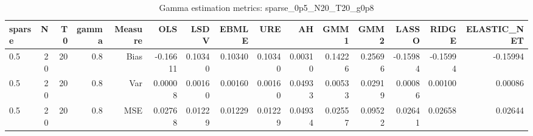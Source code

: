\begin{table}[!htbp]\centering
\caption{Gamma estimation metrics: sparse_0p5_N20_T20_g0p8}
\label{tab:table1_sparse_0p5_N20_T20_g0p8}
\begin{tabular}{lrrrrrrrrrrrrrr}
\hline
sparse & N & T0 & gamma & Measure & OLS & LSDV & EBMLE & URE & AH & GMM1 & GMM2 & LASSO & RIDGE & ELASTIC_NET \\
\hline
0.5 & 20 & 20 & 0.8 & Bias & -0.16611 & 0.10340 & 0.10340 & 0.10340 & 0.00310 & 0.14226 & 0.25696 & -0.15984 & -0.15994 & -0.15994 \\
0.5 & 20 & 20 & 0.8 & Var & 0.00008 & 0.00160 & 0.00160 & 0.00160 & 0.04933 & 0.00533 & 0.02919 & 0.00086 & 0.00100 & 0.00086 \\
0.5 & 20 & 20 & 0.8 & MSE & 0.02768 & 0.01229 & 0.01229 & 0.01229 & 0.04934 & 0.02557 & 0.09522 & 0.02641 & 0.02658 & 0.02644 \\
\hline
\end{tabular}
\end{table}

